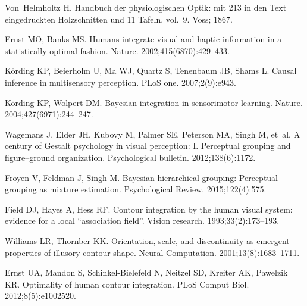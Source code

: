 \documentclass{article}
\begin{document}

% 
\begin{thebibliography}{10}

Von~Helmholtz H.
\newblock Handbuch der physiologischen Optik: mit 213 in den Text eingedruckten
  Holzschnitten und 11 Tafeln. vol.~9.
\newblock Voss; 1867.

Ernst MO, Banks MS.
\newblock Humans integrate visual and haptic information in a statistically
  optimal fashion.
\newblock Nature. 2002;415(6870):429--433.

K{\"o}rding KP, Beierholm U, Ma WJ, Quartz S, Tenenbaum JB, Shams L.
\newblock Causal inference in multisensory perception.
\newblock PLoS one. 2007;2(9):e943.

K{\"o}rding KP, Wolpert DM.
\newblock Bayesian integration in sensorimotor learning.
\newblock Nature. 2004;427(6971):244--247.

Wagemans J, Elder JH, Kubovy M, Palmer SE, Peterson MA, Singh M, et~al.
\newblock A century of Gestalt psychology in visual perception: I. Perceptual
  grouping and figure--ground organization.
\newblock Psychological bulletin. 2012;138(6):1172.

Froyen V, Feldman J, Singh M.
\newblock Bayesian hierarchical grouping: Perceptual grouping as mixture
  estimation.
\newblock Psychological Review. 2015;122(4):575.

Field DJ, Hayes A, Hess RF.
\newblock Contour integration by the human visual system: evidence for a local
  “association field”.
\newblock Vision research. 1993;33(2):173--193.

Williams LR, Thornber KK.
\newblock Orientation, scale, and discontinuity as emergent properties of
  illusory contour shape.
\newblock Neural Computation. 2001;13(8):1683--1711.

Ernst UA, Mandon S, Schinkel-Bielefeld N, Neitzel SD, Kreiter AK, Pawelzik KR.
\newblock Optimality of human contour integration.
\newblock PLoS Comput Biol. 2012;8(5):e1002520.


\end{thebibliography}
\end{document}
